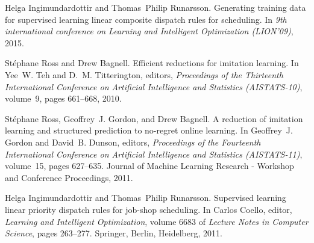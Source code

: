\documentclass[10pt,a4paper]{article}
\begin{document}
\begin{thebibliography}{11}
    Helga Ingimundardottir and Thomas~Philip Runarsson.
    \newblock Generating training data for supervised learning linear composite
    dispatch rules for scheduling.
    \newblock In \emph{9th international conference on Learning and Intelligent
        Optimization (LION'09)}, 2015.
    
    Stéphane Ross and Drew Bagnell.
    \newblock Efficient reductions for imitation learning.
    \newblock In Yee~W. Teh and D.~M. Titterington, editors, \emph{Proceedings 
    of
        the Thirteenth International Conference on Artificial Intelligence and
        Statistics (AISTATS-10)}, volume~9, pages 661--668, 2010.
    
    Stéphane Ross, Geoffrey~J. Gordon, and Drew Bagnell.
    \newblock A reduction of imitation learning and structured prediction to
    no-regret online learning.
    \newblock In Geoffrey~J. Gordon and David~B. Dunson, editors, 
    \emph{Proceedings
        of the Fourteenth International Conference on Artificial Intelligence 
        and
        Statistics (AISTATS-11)}, volume~15, pages 627--635. Journal of Machine
    Learning Research - Workshop and Conference Proceedings, 2011.
    
    Helga Ingimundardottir and Thomas~Philip Runarsson.
    \newblock Supervised learning linear priority dispatch rules for job-shop
    scheduling.
    \newblock In Carlos Coello, editor, \emph{Learning and Intelligent
        Optimization}, volume 6683 of \emph{Lecture Notes in Computer Science}, 
        pages
    263--277. Springer, Berlin, Heidelberg, 2011.
    
\end{thebibliography}
\end{document}

